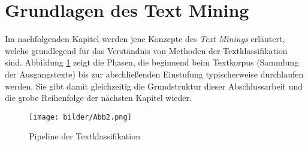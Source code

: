 \section{Grundlagen des Text Mining}\raggedbottom
Im nachfolgenden Kapitel werden jene Konzepte des \textit{Text Minings} erläutert, welche grundlegend für das Verständnis von Methoden der Textklassifikation sind. Abbildung \ref{pipetk} zeigt die Phasen, die beginnend beim Textkorpus (Sammlung der Ausgangstexte) bis zur abschließenden Einstufung typischerweise durchlaufen werden. Sie gibt damit gleichzeitig die Grundstruktur dieser Abschlussarbeit und die grobe Reihenfolge der nächsten Kapitel wieder. 
\begin{figure}[htb]
	\begin{center}
		\texttt{[image: bilder/Abb2.png]}
		\caption{Pipeline der Textklassifikation \citep{Kow19}  }\label{pipetk}
	\end{center}
\end{figure}
